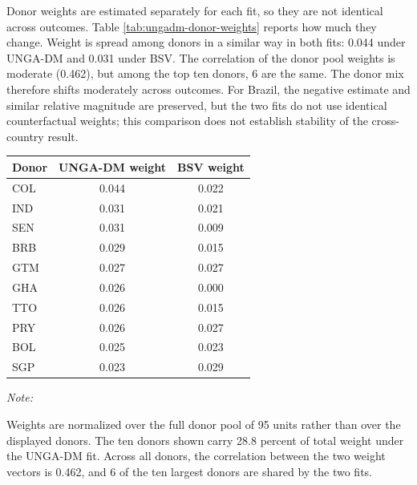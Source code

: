 \documentclass[referee,pdflatex,sn-basic]{sn-jnl}
\renewenvironment{table}[1][]{\tableorg[#1]}{\endtableorg\normalfont}
\theoremstyle{thmstylethree}
\begin{document}
Donor weights are estimated separately for each fit, so they are not identical across outcomes. Table \ref{tab:ungadm-donor-weights} reports how much they change. Weight is spread among donors in a similar way in both fits: 0.044 under UNGA-DM and 0.031 under BSV. The correlation of the donor pool weights is moderate (0.462), but among the top ten donors, 6 are the same. The donor mix therefore shifts moderately across outcomes. For Brazil, the negative estimate and similar relative magnitude are preserved, but the two fits do not use identical counterfactual weights; this comparison does not establish stability of the cross-country result.

\begin{table}[H]
\centering
\caption{\label{tab:ungadm-donor-weights}Ten largest synthetic-control donor weights under the UNGA-DM fit, with the weight the same donor receives under the main outcome.}
\centering
\fontsize{9}{11}\selectfont
\begin{threeparttable}
\begin{tabular}[t]{lcc}
\toprule
Donor & UNGA-DM weight & BSV weight\\
\midrule
COL & 0.044 & 0.022\\
IND & 0.031 & 0.021\\
SEN & 0.031 & 0.009\\
BRB & 0.029 & 0.015\\
GTM & 0.027 & 0.027\\
\addlinespace
GHA & 0.026 & 0.000\\
TTO & 0.026 & 0.015\\
PRY & 0.026 & 0.027\\
BOL & 0.025 & 0.023\\
SGP & 0.023 & 0.029\\
\bottomrule
\end{tabular}
\begin{tablenotes}
\item \textit{Note: } 
\item Weights are normalized over the full donor pool of 95 units rather than over the displayed donors. The ten donors shown carry 28.8 percent of total weight under the UNGA-DM fit. Across all donors, the correlation between the two weight vectors is 0.462, and 6 of the ten largest donors are shared by the two fits.
\end{tablenotes}
\end{threeparttable}
\end{table}
\end{document}
